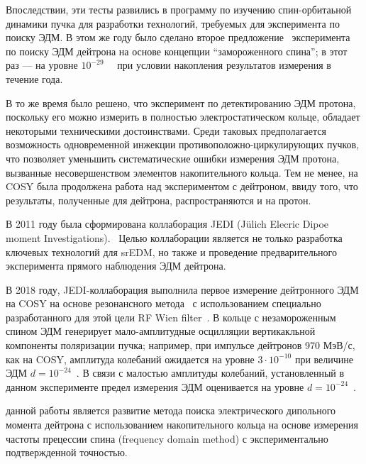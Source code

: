 Впоследствии, эти тесты развились в программу по изучению спин-орбитаьной динамики пучка для разработки технологий, требуемых для эксперимента по поиску ЭДМ. В этом же году было сделано второе предложение~\cite{BNL:Deuteron2008} эксперимента по поиску ЭДМ дейтрона на основе концепции ``замороженного спина''; в этот раз --- на уровне $10^{-29}$~\ecm~ при условии накопления результатов измерения в течение года.

В то же время было решено, что эксперимент по детектированию ЭДМ протона, поскольку его можно измерить в полностью электростатическом кольце, обладает некоторыми техническими достоинствами. Среди таковых предполагается возможность одновременной инжекции противоположно-циркулирующих пучков, что позволяет уменьшить систематические ошибки измерения ЭДМ протона, вызванные несовершенством элементов накопительного кольца. Тем не менее, на COSY была продолжена работа над экспериментом с дейтроном, ввиду того, что результаты, полученные для дейтрона, распространяются и на протон.

В 2011 году была сформирована коллаборация JEDI (J\"ulich Elecric Dipoe moment Investigations).~\cite{JEDI:Website} Целью коллаборации является не только разработка ключевых технологий для srEDM, но также и проведение предварительного эксперимента прямого наблюдения ЭДМ дейтрона. 

В 2018 году, JEDI-коллаборация выполнила первое измерение дейтронного ЭДМ на COSY на основе резонансного метода~\cite{COSY:Partially-Frozen-Spin, COSY:SpinTuneMapping} с использованием специально разработанного для этой цели RF Wien filter~\cite{JSlim:RFWF:Design, JSlim:RFWF:Commisioning}. В кольце с незамороженным спином 
ЭДМ генерирует мало-амплитудные осцилляции вертикакльной компоненты поляризации пучка; например, 
при импульсе дейтронов 970 МэВ/с, как на COSY, амплитуда колебаний ожидается на уровне 
$3\cdot10^{-10}$ при величине ЭДМ $d = 10^{-24}$~\ecm. В связи с малостью амплитуды колебаний, установленный в данном эксперименте предел измерения ЭДМ оценивается на уровне $d=10^{-24}$~\ecm.


{\aim} данной работы является развитие метода поиска электрического дипольного момента дейтрона с использованием накопительного кольца на основе измерения частоты прецессии спина (frequency domain method) с экспериментально подтвержденной точностью.


